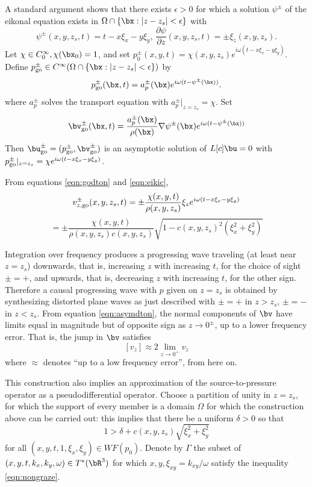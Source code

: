 A standard argument shows that there exists $\epsilon > 0$ for which a solution $\psi^{\pm}$ of the eikonal equation exists in $\Omega \cap \{\bx: |z-z_s|<\epsilon\}$ with
\begin{equation}
  \label{eqn:eikic}
  \psi^{\pm}(x,y,z_s,t) = t -x \xi_x - y \xi_y, \, \frac{\partial \psi}{\partial z}(x,y,z_s,t) = \pm \xi_z(x,y,z_s).
\end{equation}
Let $\chi \in C_0^{\infty}, \chi(\bx_0)=1$, and set $p_0^{\pm}(x,y,t) = \chi(x,y,z_s)e^{i\omega(t-x\xi_x - y\xi_y)}$. Define $p_{\rm go}^{\pm} \in C^{\infty}(\Omega \cap \{\bx: |z-z_s|<\epsilon\})$ by
\[
  p_{\rm go}^{\pm}(\bx,t) = a^{\pm}_p(\bx) e^{i\omega (t-\psi^{\pm}(\bx))}.
\]
where $a^{\pm}_p$ solves the transport equation with $a^{\pm}_p|_{z=z_s} = \chi$. Set
\[
  \bv^{\pm}_{\rm go}(\bx,t) = \frac{a^{\pm}_p(\bx)}{\rho(\bx)}\nabla \psi^{\pm}(\bx) e^{i\omega (t-\psi^{\pm}(\bx))}
\]
Then $\bu^{\pm}_{\rm go} = (p^{\pm}_{\rm go}, \bv^{\pm}_{\rm go})$ is an asymptotic solution of $L[c]\bu = 0$ with $p^{\pm}_{\rm go}|_{z=z_s} = \chi e^{i\omega(t-x\xi_x - y\xi_y)}$.

From equations \ref{eqn:godton} and \ref{eqn:eikic},
\[
  v_{z,{\rm go}}^{\pm}(x,y,z_s,t) = \pm \frac{\chi(x,y,t)}{\rho(x,y,z_s)}\xi_z  e^{i\omega(t-x\xi_x - y\xi_y)}
\]
\begin{equation}
  \label{eqn:asymdton}
= \pm \frac{\chi(x,y,t)}{\rho(x,y,z_s)c(x,y,z_s)}\sqrt{1-c(x,y,z_s)^2(\xi_x^2+\xi_y^2)}
\end{equation}

Integration over frequency produces a progressing wave traveling (at least near $z=z_s$) downwards, that is, increasing $z$ with increasing $t$, for the choice of sight $\pm = +$, and upwards, that is, decreasing $z$ with increasing $t$, for the other sign. Therefore a causal progressing wave with $p$ given on $z=z_s$ is obtained by synthesizing distorted plane waves as just described with $\pm = +$ in $z>z_s$, $\pm=-$ in $z<z_s$. From equation \ref{eqn:asymdton}, the normal components of $\bv$ have limits equal in magnitude but of opposite sign as $z\rightarrow 0^{\pm}$, up to a lower frequency error. That is, the jump in $\bv$ satisfies
\begin{equation}
  \label{eqn:asymjump}
  [v_z]\approx 2\lim_{z\rightarrow 0^+} v_{z}
\end{equation}
where $\approx$ denotes ``up to a low frequency error'', from here on.

This construction also implies an approximation of the source-to-pressure operator as a pseudodifferential operator. Choose a partition of unity in $z=z_s$, for which the support of every member is a domain $\Omega$ for which the construction above can be carried out: this implies that there be a uniform $\delta > 0$ so that
\begin{equation}
  \label{eqn:nongraze}
  1>\delta + c(x,y,z_s)\sqrt{\xi_x^2+\xi_y^2}
\end{equation}
for all $(x,y,t,1,\xi_x,\xi_y) \in WF(p_0)$. Denote by $\Gamma$ the subset of $(x,y,t,k_x,k_y,\omega) \in T^*(\bR^3)$ for which $x,y,\xi_{xy}=k_{xy}/\omega$ satisfy the inequality \ref{eqn:nongraze}.

